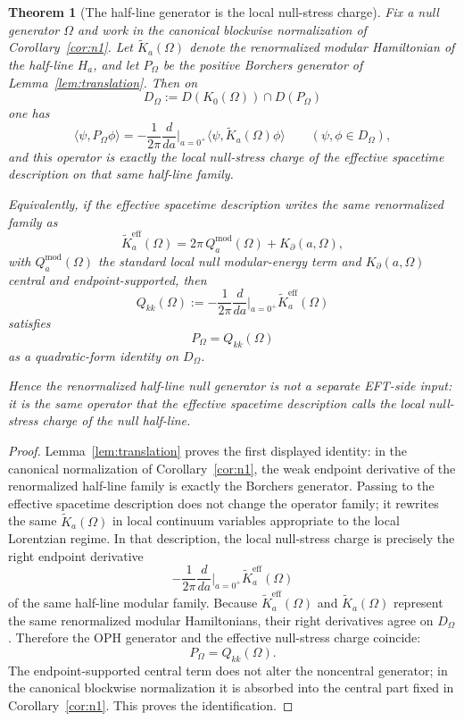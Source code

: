 \documentclass[11pt]{article}
\newtheorem{theorem}{Theorem}[section]
\begin{document}
\begin{theorem}[The half-line generator is the local null-stress charge]\label{thm:stress}
Fix a null generator \(\Omega\) and work in the canonical blockwise normalization of Corollary~\ref{cor:n1}. Let \(\widetilde K_a(\Omega)\) denote the renormalized modular Hamiltonian of the half-line \(H_a\), and let \(P_\Omega\) be the positive Borchers generator of Lemma~\ref{lem:translation}. Then on
\[
D_\Omega:=D(K_0(\Omega))\cap D(P_\Omega)
\]
one has
\[
\langle\psi,P_\Omega\phi\rangle
=
-\frac{1}{2\pi}\frac{d}{da}\Big|_{a=0^+}
\langle\psi,\widetilde K_a(\Omega)\phi\rangle
\qquad (\psi,\phi\in D_\Omega),
\]
and this operator is exactly the local null-stress charge of the effective spacetime description on that same half-line family.

Equivalently, if the effective spacetime description writes the same renormalized family as
\[
\widetilde K^{\mathrm{eff}}_a(\Omega)
=
2\pi\,Q^{\mathrm{mod}}_a(\Omega)+K_{\partial}(a,\Omega),
\]
with \(Q^{\mathrm{mod}}_a(\Omega)\) the standard local null modular-energy term and \(K_{\partial}(a,\Omega)\) central and endpoint-supported, then
\[
Q_{kk}(\Omega)
:=
-\frac{1}{2\pi}\frac{d}{da}\Big|_{a=0^+}\widetilde K^{\mathrm{eff}}_a(\Omega)
\]
satisfies
\[
P_\Omega = Q_{kk}(\Omega)
\]
as a quadratic-form identity on \(D_\Omega\).

Hence the renormalized half-line null generator is not a separate EFT-side input: it is the same operator that the effective spacetime description calls the local null-stress charge of the null half-line.
\end{theorem}

\begin{proof}
Lemma~\ref{lem:translation} proves the first displayed identity: in the canonical normalization of Corollary~\ref{cor:n1}, the weak endpoint derivative of the renormalized half-line family is exactly the Borchers generator. Passing to the effective spacetime description does not change the operator family; it rewrites the same \(\widetilde K_a(\Omega)\) in local continuum variables appropriate to the local Lorentzian regime. In that description, the local null-stress charge is precisely the right endpoint derivative
\[
-\frac{1}{2\pi}\frac{d}{da}\Big|_{a=0^+}\widetilde K^{\mathrm{eff}}_a(\Omega)
\]
of the same half-line modular family. Because \(\widetilde K^{\mathrm{eff}}_a(\Omega)\) and \(\widetilde K_a(\Omega)\) represent the same renormalized modular Hamiltonians, their right derivatives agree on \(D_\Omega\). Therefore the OPH generator and the effective null-stress charge coincide:
\[
P_\Omega = Q_{kk}(\Omega).
\]
The endpoint-supported central term does not alter the noncentral generator; in the canonical blockwise normalization it is absorbed into the central part fixed in Corollary~\ref{cor:n1}. This proves the identification.
\end{proof}
\end{document}
